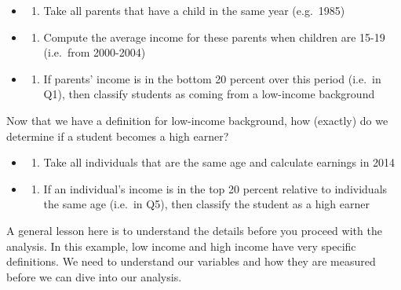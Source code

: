 \documentclass[
]{book}
\providecommand{\tightlist}{%
  \setlength{\itemsep}{0pt}\setlength{\parskip}{0pt}}
\begin{document}
\begin{itemize}
\tightlist
\item
  \begin{enumerate}
  \def\labelenumi{\arabic{enumi}.}
  \tightlist
  \item
    Take all parents that have a child in the same year (e.g.~1985)
  \end{enumerate}
\item
  \begin{enumerate}
  \def\labelenumi{\arabic{enumi}.}
  \setcounter{enumi}{1}
  \tightlist
  \item
    Compute the average income for these parents when children are 15-19 (i.e.~from 2000-2004)
  \end{enumerate}
\item
  \begin{enumerate}
  \def\labelenumi{\arabic{enumi}.}
  \setcounter{enumi}{2}
  \tightlist
  \item
    If parents' income is in the bottom 20 percent over this period (i.e.~in Q1), then classify students as coming from a low-income background
  \end{enumerate}
\end{itemize}

Now that we have a definition for low-income background, how (exactly) do we determine if a student becomes a high earner?

\begin{itemize}
\tightlist
\item
  \begin{enumerate}
  \def\labelenumi{\arabic{enumi}.}
  \tightlist
  \item
    Take all individuals that are the same age and calculate earnings in 2014
  \end{enumerate}
\item
  \begin{enumerate}
  \def\labelenumi{\arabic{enumi}.}
  \setcounter{enumi}{1}
  \tightlist
  \item
    If an individual's income is in the top 20 percent relative to individuals the same age (i.e.~in Q5), then classify the student as a high earner
  \end{enumerate}
\end{itemize}

A general lesson here is to understand the details before you proceed with the analysis. In this example, low income and high income have very specific definitions. We need to understand our variables and how they are measured before we can dive into our analysis.
\end{document}
